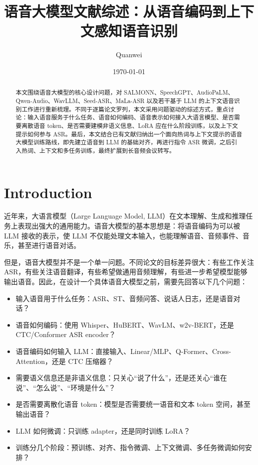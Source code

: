 \documentclass[UTF8,fontset=fandol]{ctexart}
\title{语音大模型文献综述：从语音编码到上下文感知语音识别}
\author{Quanwei}
\date{\today}
\begin{document}
\maketitle

\begin{abstract}
本文围绕语音大模型的核心设计问题，对 SALMONN、SpeechGPT、AudioPaLM、Qwen-Audio、WavLLM、Seed-ASR、MaLa-ASR 以及若干基于 LLM 的上下文语音识别工作进行重新梳理。不同于逐篇论文罗列，本文采用问题驱动的综述方式，重点讨论：输入语音服务于什么任务、语音如何编码、语音表示如何接入大语言模型、是否需要离散语音 token、是否需要建模非语义信息、LoRA 应在什么阶段训练，以及上下文提示如何参与 ASR。最后，本文结合已有文献归纳出一个面向热词与上下文提示的语音大模型训练路线，即先建立语音到 LLM 的基础对齐，再进行指令 ASR 微调，之后引入热词、上下文和多任务训练，最终扩展到长音频会议转写。
\end{abstract}

\section{Introduction}

近年来，大语言模型（Large Language Model, LLM）在文本理解、生成和推理任务上表现出强大的通用能力。语音大模型的基本思想是：将语音编码为可以被 LLM 接收的表示，使 LLM 不仅能处理文本输入，也能理解语音、音频事件、音乐，甚至进行语音对话。

但是，语音大模型并不是一个单一问题。不同论文的目标差异很大：有些工作关注 ASR，有些关注语音翻译，有些希望做通用音频理解，有些进一步希望模型能够输出语音。因此，在设计一个具体语音大模型之前，需要先回答以下几个问题：

\begin{itemize}
  \item 输入语音用于什么任务：ASR、ST、音频问答、说话人日志，还是语音对话？
  \item 语音如何编码：使用 Whisper、HuBERT、WavLM、w2v-BERT，还是 CTC/Conformer ASR encoder？
  \item 语音编码如何输入 LLM：直接输入、Linear/MLP、Q-Former、Cross-Attention，还是 CTC 压缩器？
  \item 需要语义信息还是非语义信息：只关心``说了什么''，还是还关心``谁在说''、``怎么说''、``环境是什么''？
  \item 是否需要离散化语音 token：模型是否需要统一语音和文本 token 空间，甚至输出语音？
  \item LLM 如何微调：只训练 adapter，还是同时训练 LoRA？
  \item 训练分几个阶段：预训练、对齐、指令微调、上下文微调、多任务微调如何安排？
\end{itemize}
\end{document}
